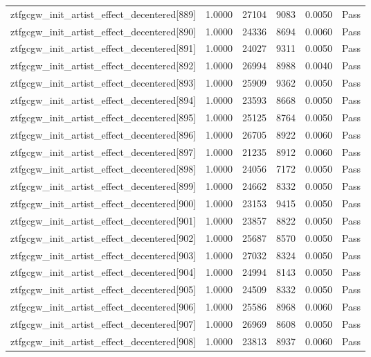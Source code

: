 \begin{table}[htbp]
\begin{tabular}{llrrll}
ztfgcgw\_init\_artist\_effect\_decentered[889] & 1.0000 & 27104 & 9083 & 0.0050 & Pass \\
ztfgcgw\_init\_artist\_effect\_decentered[890] & 1.0000 & 24336 & 8694 & 0.0060 & Pass \\
ztfgcgw\_init\_artist\_effect\_decentered[891] & 1.0000 & 24027 & 9311 & 0.0050 & Pass \\
ztfgcgw\_init\_artist\_effect\_decentered[892] & 1.0000 & 26994 & 8988 & 0.0040 & Pass \\
ztfgcgw\_init\_artist\_effect\_decentered[893] & 1.0000 & 25909 & 9362 & 0.0050 & Pass \\
ztfgcgw\_init\_artist\_effect\_decentered[894] & 1.0000 & 23593 & 8668 & 0.0050 & Pass \\
ztfgcgw\_init\_artist\_effect\_decentered[895] & 1.0000 & 25125 & 8764 & 0.0050 & Pass \\
ztfgcgw\_init\_artist\_effect\_decentered[896] & 1.0000 & 26705 & 8922 & 0.0060 & Pass \\
ztfgcgw\_init\_artist\_effect\_decentered[897] & 1.0000 & 21235 & 8912 & 0.0060 & Pass \\
ztfgcgw\_init\_artist\_effect\_decentered[898] & 1.0000 & 24056 & 7172 & 0.0050 & Pass \\
ztfgcgw\_init\_artist\_effect\_decentered[899] & 1.0000 & 24662 & 8332 & 0.0050 & Pass \\
ztfgcgw\_init\_artist\_effect\_decentered[900] & 1.0000 & 23153 & 9415 & 0.0050 & Pass \\
ztfgcgw\_init\_artist\_effect\_decentered[901] & 1.0000 & 23857 & 8822 & 0.0050 & Pass \\
ztfgcgw\_init\_artist\_effect\_decentered[902] & 1.0000 & 25687 & 8570 & 0.0050 & Pass \\
ztfgcgw\_init\_artist\_effect\_decentered[903] & 1.0000 & 27032 & 8324 & 0.0050 & Pass \\
ztfgcgw\_init\_artist\_effect\_decentered[904] & 1.0000 & 24994 & 8143 & 0.0050 & Pass \\
ztfgcgw\_init\_artist\_effect\_decentered[905] & 1.0000 & 24509 & 8332 & 0.0050 & Pass \\
ztfgcgw\_init\_artist\_effect\_decentered[906] & 1.0000 & 25586 & 8968 & 0.0060 & Pass \\
ztfgcgw\_init\_artist\_effect\_decentered[907] & 1.0000 & 26969 & 8608 & 0.0050 & Pass \\
ztfgcgw\_init\_artist\_effect\_decentered[908] & 1.0000 & 23813 & 8937 & 0.0060 & Pass \\

\end{tabular}
\end{table}
